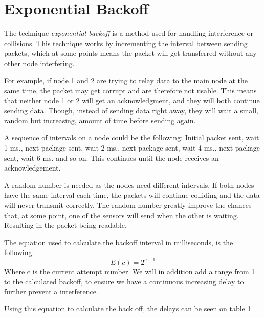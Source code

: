 \section{Exponential Backoff}\label{cha:expbackoff}
The technique \textit{exponential backoff} is a method used for handling interference or collisions. This technique works by incrementing the interval between sending packets, which at some points means the packet will get transferred without any other node interfering. 

For example, if node 1 and 2 are trying to relay data to the main node at the same time, the packet may get corrupt and are therefore not usable. This means that neither node 1 or 2 will get an acknowledgment, and they will both continue sending data. Though, instead of sending data right away, they will wait a small, random but increasing, amount of time before sending again.

A sequence of intervals on a node could be the following: Initial packet sent, wait 1 ms., next package sent, wait 2 ms.,  next package sent, wait 4 ms., next package sent, wait 6 ms. and so on. This continues until the node receives an acknowledgement.

A random number is needed as the nodes need different intervals. If both nodes have the same interval each time, the packets will continue colliding and the data will never transmit correctly. The random number greatly improve the chances that, at some point, one of the sensors will send when the other is waiting. Resulting in the packet being readable.

The equation used to calculate the backoff interval in milliseconds, is the following:
\begin{equation}
E(c)=2^{c-1}
\end{equation}
Where c is the current attempt number.
We will in addition add a range from 1 to the calculated backoff, to ensure we have a  continuous increasing delay to further prevent a interference.

Using this equation to calculate the back off, the delays can be seen on table \ref{cha:expbackoff}.

